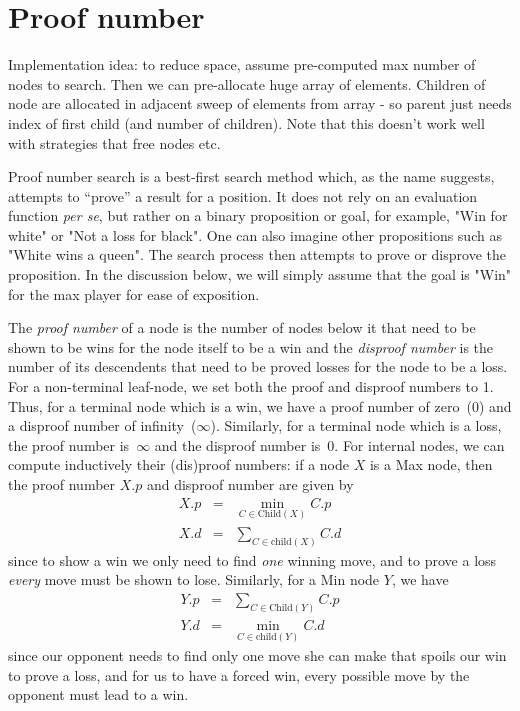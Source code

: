 \documentclass[10pt,dvipdfmx]{report}
\begin{document}
\section{Proof number}

Implementation idea: to reduce space, assume pre-computed max number of nodes to search.  Then we can 
pre-allocate huge array of elements.  Children of node are allocated in adjacent sweep of elements from
array - so parent just needs index of first child (and number of children).  Note that this doesn't work
well with strategies that free nodes etc.

Proof number search is a best-first search method which, as the name suggests, attempts
to ``prove'' a result for a position.  It does not rely on an evaluation function {\it per se},
but rather on a binary proposition or goal, for example, "Win for white" or "Not a loss for black".
One can also imagine other propositions such as "White wins a queen".
The search process then attempts to prove or disprove the proposition.
In the discussion below, we will simply assume that the goal is "Win" for the max player for
ease of exposition.

The {\it proof number} of a node is the number of nodes below it that need to
be shown to be wins for the node itself to be a win and the {\it disproof number}
is the number of its descendents that need to be proved losses for the node to be a loss.
For a non-terminal leaf-node, we set both the proof and disproof numbers to 1.
Thus, for a terminal node which is a win, we have a proof number of zero~($0$) and a disproof number of infinity~($\infty$).
Similarly, for a terminal node which is a loss, the proof number is~$\infty$ and the disproof number is~$0$.
For internal nodes, we can compute inductively their (dis)proof numbers: if a node $X$ is a Max node,
then the proof number $X.p$ and disproof number are given by
\begin{eqnarray*}
X.p &=& \min_{C\in\text{Child}(X)} C.p \\
X.d &=& \sum_{C\in\text{child}(X)} C.d
\end{eqnarray*}
since to show a win we only need to find {\em one} winning move,
and to prove a loss {\em every} move must be shown to lose.
Similarly, for a Min node $Y$, we have
\begin{eqnarray*}
Y.p &=& \sum_{C\in\text{Child}(Y)} C.p \\
Y.d &=& \min_{C\in\text{child}(Y)} C.d
\end{eqnarray*}
since our opponent needs to find only one move she can make that spoils our win to prove a loss,
and for us to have a forced win, every possible move by the opponent must lead to a win.
\end{document}
